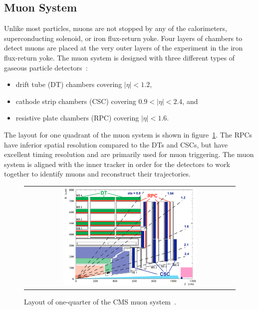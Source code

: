 \subsection{Muon System}
Unlike most particles, muons are not stopped by any of the calorimeters, superconducting solenoid, or iron flux-return yoke. 
Four layers of chambers to detect muons are placed at the very outer layers of the experiment in the iron flux-return yoke. 
The muon system is designed with three different types of gaseous particle detectors~\cite{Bayatian:922757}: 
\begin{itemize}
\item drift tube (DT) chambers covering $\vert \eta \vert < 1.2$,
\item cathode strip chambers (CSC) covering $0.9 < \vert \eta \vert < 2.4$, and
\item resistive plate chambers (RPC) covering $\vert \eta \vert < 1.6$.
\end{itemize}
The layout for one quadrant of the muon system is shown in figure~\ref{Muon_System}.
The RPCs have inferior spatial resolution compared to the DTs and CSCs, but have excellent timing resolution and are primarily used for muon triggering.
The muon system is aligned with the inner tracker in order for the detectors to work together to identify muons and reconstruct their trajectories.
\begin{figure}[htb]
  \begin{center}
    \begin{tabular}{c}
        \includegraphics[width=0.65\textwidth]{fig_LHC_CMS/Muon_System.png}
    \end{tabular}
    \caption{Layout of one-quarter of the CMS muon system~\cite{Bayatian:922757}.
            }
    \label{Muon_System}
  \end{center}
\end{figure}

